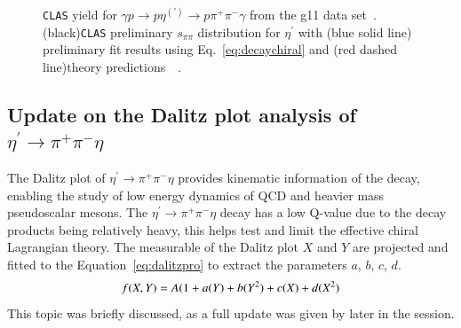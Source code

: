 \documentclass[epj]{webofc}
\begin{document}
\begin{figure}[h!]
		\caption[Something]{\label{fig:g11rad_decay}\textsc{\texttt{CLAS}} yield for $\gamma p \to p \eta^{(\prime)} \to p \pi^+ \pi^- \gamma $ from the g11 data set~.(black)\textsc{\texttt{CLAS}} preliminary $s_{\pi\pi}$ distribution for $\eta^{\prime}$ with (blue solid line) preliminary fit results using Eq.~\ref{eq:decaychiral} and (red dashed line)theory predictions~\cite{Kubis2015}~.}
		
\end{figure}
\subsection{Update on the Dalitz plot analysis of $\eta^{\prime} \to \pi^+ \pi^- \eta$}
The Dalitz plot of $\eta^{\prime} \to \pi^+ \pi^- \eta$ provides kinematic information of the decay, enabling the study of low energy dynamics of QCD and heavier mass pseudoscalar mesons. The  $\eta^{\prime} \to \pi^+ \pi^- \eta$ decay has a low Q-value due to the decay products being relatively heavy, this helps test and limit the effective chiral Lagrangian theory. The measurable of the Dalitz plot $X$ and $Y$ are projected and fitted to the Equation~\ref{eq:dalitzpro} to extract the parameters $a$, $b$, $c$, $d$. %
\begin{equation}
f(X,Y) = A(1+a(Y) + b (Y^2) + c(X) + d(X^2)  \label{eq:dalitzpro} \\
\end{equation}
%
This topic was briefly discussed, as a full update was given by later in the session.
\FloatBarrier
\end{document}

